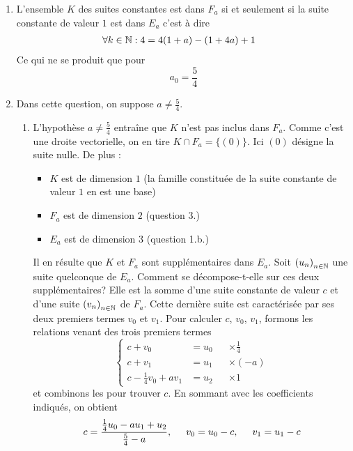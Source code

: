 \begin{enumerate}
\item L'ensemble $K$ des suites constantes est dans $F_a$ si et seulement si la suite constante de valeur $1$ est dans $E_a$ c'est à dire
\begin{align*}
 \forall k\in \mathbb{N} &: 4 = 4(1+a)-(1+4a)+1
\end{align*}
Ce qui ne se produit que pour
\begin{displaymath}
 a_0 = \dfrac{5}{4}
\end{displaymath}
\item Dans cette question, on suppose $a\neq\frac{5}{4}$.
\begin{enumerate}
 \item 
L'hypothèse $a\neq\frac{5}{4}$ entraîne que $K$ n'est pas inclus dans $F_a$. Comme c'est une droite vectorielle, on en tire $K\cap F_a=\{(0)\}$. Ici $(0)$ désigne la suite nulle. De plus :
\begin{itemize}
 \item $K$ est de dimension $1$ (la famille constituée de la suite constante de valeur $1$ en est une base) 
\item $F_a$ est de dimension $2$ (question 3.)
\item  $E_a$ est de dimension $3$  (question 1.b.)
\end{itemize}
Il en résulte que $K$ et $F_a$ sont supplémentaires dans $E_a$.\newline 
Soit $\left( u_n\right) _{n\in \mathbb{N}}$ une suite quelconque de $E_a$. Comment se décompose-t-elle sur ces deux supplémentaires?\newline
Elle est la somme d'une suite constante de valeur $c$ et d'une suite $\left( v_n\right) _{n\in \mathbb{N}}$ de $F_a$. Cette dernière suite est caractérisée par ses deux premiers termes $v_0$ et $v_1$. Pour calculer $c$, $v_0$, $v_1$, formons les relations venant des trois premiers termes
\begin{displaymath}
\left\lbrace  
\begin{aligned}
 c + v_0 &= u_0 & &\times\frac{1}{4}\\
 c + v_1 &= u_1 & &\times(-a)\\
 c -\frac{1}{4} v_0 + av_1 &= u_2 & &\times 1
\end{aligned}
\right. 
\end{displaymath}
et combinons les pour trouver $c$. En sommant avec les coefficients indiqués, on obtient
\begin{displaymath}
  c=\frac{\frac{1}{4}u_0-au_1+u_2}{\frac{5}{4}-a},\hspace{0.5cm} v_0=u_0 -c,\hspace{0.5cm} v_1=u_1 -c
\end{displaymath}


\end{enumerate}
\end{enumerate}
